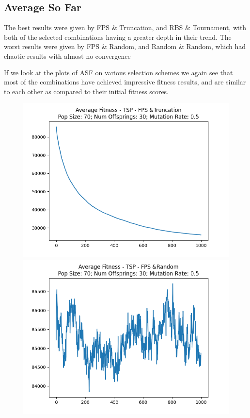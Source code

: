 \documentclass[12pt]{report}
\theoremstyle{mytheoremstyle}
\theoremstyle{mytheoremstyle}
\theoremstyle{myproblemstyle}
\begin{document}
\subsection{Average So Far}
The best results were given by FPS \& Truncation, and RBS \& Tournament, with both of the selected combinations having a greater depth in their trend. The worst results were given by FPS \& Random, and Random \& Random, which had chaotic results with almost no convergence

If we look at the plots of ASF on various selection schemes we again see that most of the combinations have achieved impressive fitness results, and are similar to each other as compared to their initial fitness scores.
\begin{figure}[!]

	\begin{minipage}{0.4\textwidth}
		\includegraphics[width=\linewidth]{../Analysis/ASF_TSP_0_3_70_30.png}
	\end{minipage}
	\hspace{\fill}
	\begin{minipage}{0.4\textwidth}
		\includegraphics[width=\linewidth]{../Analysis/ASF_TSP_0_4_70_30.png}

\end{minipage}
\end{figure}
\end{document}
